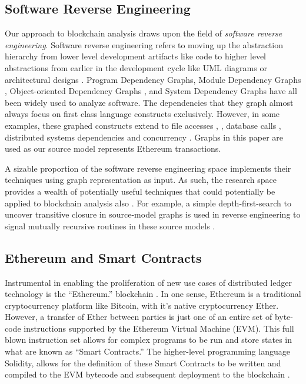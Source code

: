 \documentclass[conference]{IEEEtran}
\begin{document}
\subsection{Software Reverse Engineering}\label{RevEng}
Our approach to blockchain analysis draws upon the field of \emph{software reverse engineering}.  Software reverse engineering refers to moving up the abstraction hierarchy from lower level development artifacts like code to higher level abstractions from earlier in the development cycle like UML diagrams or architectural designs \cite{chikofsky1990reverse}. Program Dependency Graphs\cite{fan2012testing}, Module Dependency Graphs \cite{mamaghani2009clustering}, Object-oriented Dependency Graphs \cite{chen1997object}, and System Dependency Graphs \cite{sinha1999system} have all been widely used to analyze software. The dependencies that they graph almost always focus on first class language constructs exclusively. However, in some examples, these graphed constructs extend to file accesses \cite{moser1990data}, \cite{cleve2006data}, database calls \cite{liu2011extraction}, distributed systems dependencies \cite{holtzblatt1997design} and concurrency \cite{zhao1999multithreaded}. Graphs in this paper are used as our source model represents Ethereum transactions.  

A sizable proportion of the software reverse engineering space implements their techniques using graph representation as input.  As such, the research space provides a wealth of potentially useful techniques that could potentially be applied to blockchain analysis also \cite{kramer1996design} \cite{duenas1998architecture} \cite{fan2012testing} \cite{mamaghani2009clustering} \cite{chen1997object} \cite{lee2010study} \cite{holtzblatt1997design} \cite{willmor2004program}. 
For example, a simple depth-first-search to uncover transitive closure in source-model graphs is used in reverse engineering to signal mutually recursive routines in these source models \cite{cimitile1995software}.


\subsection{Ethereum and Smart Contracts}

Instrumental in enabling the proliferation of new use cases of distributed ledger technology is the ``Ethereum.'' blockchain \cite{dhillon2017unpacking}.  In one sense, Ethereum is a traditional cryptocurrency platform like Bitcoin, with it's native cryptocurrency Ether.  However, a transfer of Ether between parties is just one of an entire set of byte-code instructions supported by the Ethereum Virtual Machine (EVM). This full blown instruction set allows for complex programs to be run and store states in what are known as ``Smart Contracts.'' \cite{buterin2014next}  The higher-level programming language Solidity, allows for the definition of these Smart Contracts to be written and compiled to the EVM bytecode and subsequent deployment to the blockchain \cite{dannen2017introducing}.  
\end{document}
